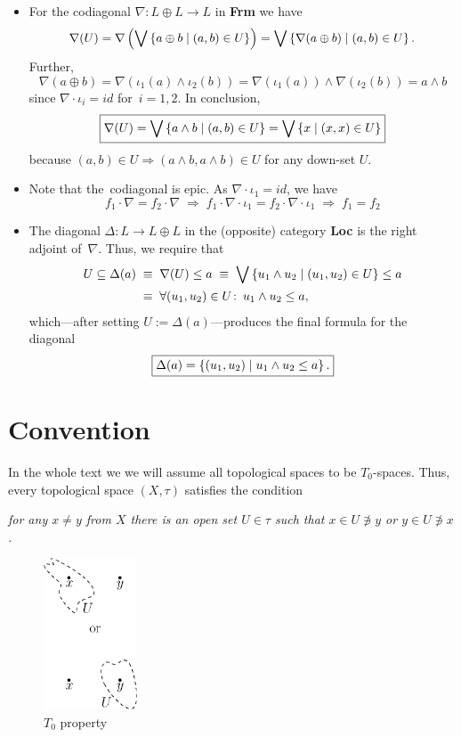 \begin{itemize}
\item
{}
\label{codiag-in-Frm}
For the codiagonal $\nabla\colon L \oplus L \to L$ in {\bf Frm} we have
\[
  \nabla(U)
  = \nabla \left( \bigvee \left\{ a \oplus b \mid (a, b)\in U \right\} \right)
  = \bigvee \left\{ \nabla(a \oplus b) \mid (a, b)\in U \right\}.
\]
Further,
\[
  \nabla(a \oplus b)
  = \nabla( \iota_1(a) \wedge \iota_2(b) )
  = \nabla(\iota_1(a)) \wedge \nabla(\iota_2(b))
  = a \wedge b
\]
since $\nabla\cdot \iota_i = id$ for~$i = 1, 2$.
In conclusion,
\[
  \boxed{
    \nabla(U)
    = \bigvee \left\{ a \wedge b \mid (a, b)\in U \right\}
    = \bigvee \left\{ x \mid (x, x)\in U \right\}
  }
\]
because $(a, b)\in U \Rightarrow (a \wedge b, a \wedge b)\in U$ for any
down-set $U$.

\item Note that the~codiagonal is epic.
As $\nabla \cdot \iota_1 = id$, we have
\[
  f_1 \cdot \nabla = f_2 \cdot \nabla
  \; \Longrightarrow \;
  f_1 \cdot \nabla \cdot \iota_1 = f_2 \cdot \nabla \cdot \iota_1
  \; \Longrightarrow \;
  f_1 = f_2
\]

\item The diagonal $\Delta\colon L \to L \oplus L$ in the (opposite) category
{\bf Loc} is the right adjoint of~$\nabla$.
Thus, we require that
\begin{align*}
  U\subseteq \Delta(a)
  \; &\equiv \; \nabla(U) \le a
  \; \equiv \; \bigvee \left\{ u_1 \wedge u_2 \mid (u_1, u_2)\in U \right\} \le
  a \\
  \; &\equiv \; \forall (u_1, u_2)\in U\colon \, u_1 \wedge u_2 \le a,
\end{align*}
which---after setting $U := \Delta(a)$---produces the final formula for the
diagonal
\[
  \boxed{
    \Delta(a) = \left\{ (u_1, u_2) \mid u_1 \wedge u_2 \le a \right\}.
  }
\]
\end{itemize}

\section*{Convention}

In the whole text we we will assume all topological spaces to be $T_0$-spaces.
Thus, every topological space $(X, \tau)$ satisfies the condition
\begin{center} \it
  for any $x \ne y$ from $X$ there is an open set $U \in \tau$ such that $x \in
  U \not\owns y$ or $y \in U \not\owns x$.
\end{center}

\begin{figure}[h]
  \centering
  \includegraphics[height=45mm]{../img/t0.eps}
  \caption{$T_0$ property}
\end{figure}
